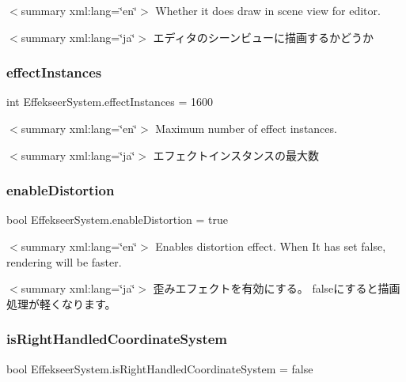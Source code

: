 $<$summary xml\+:lang=\char`\"{}en\char`\"{}$>$ Whether it does draw in scene view for editor. 

$<$summary xml\+:lang=\char`\"{}ja\char`\"{}$>$ エディタのシーンビューに描画するかどうか \mbox{\label{class_effekseer_system_a0516609db2194d83016f439b93510f21}} 
\subsubsection{\texorpdfstring{effect\+Instances}{effectInstances}}
{\footnotesize\ttfamily int Effekseer\+System.\+effect\+Instances = 1600}

$<$summary xml\+:lang=\char`\"{}en\char`\"{}$>$ Maximum number of effect instances. 

$<$summary xml\+:lang=\char`\"{}ja\char`\"{}$>$ エフェクトインスタンスの最大数 \mbox{\label{class_effekseer_system_ad8a639d37912d6a3ada4ba5a065a7493}} 
\subsubsection{\texorpdfstring{enable\+Distortion}{enableDistortion}}
{\footnotesize\ttfamily bool Effekseer\+System.\+enable\+Distortion = true}

$<$summary xml\+:lang=\char`\"{}en\char`\"{}$>$ Enables distortion effect. When It has set false, rendering will be faster. 

$<$summary xml\+:lang=\char`\"{}ja\char`\"{}$>$ 歪みエフェクトを有効にする。 falseにすると描画処理が軽くなります。 \mbox{\label{class_effekseer_system_a106a9e679535bdacd968ab94c421321e}} 
\subsubsection{\texorpdfstring{is\+Right\+Handled\+Coordinate\+System}{isRightHandledCoordinateSystem}}
{\footnotesize\ttfamily bool Effekseer\+System.\+is\+Right\+Handled\+Coordinate\+System = false}

